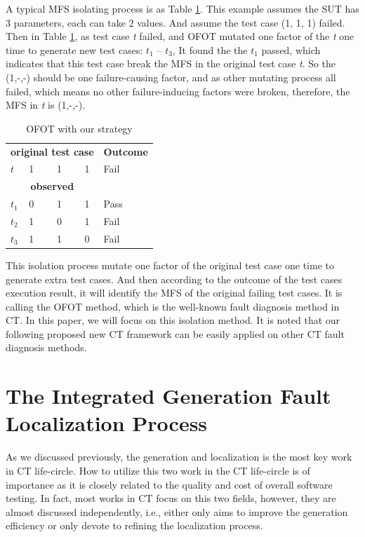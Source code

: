 \documentclass{sig-alternate}
\begin{document}
A typical MFS isolating process is as Table \ref{ofot-identify}. This example assumes the SUT has 3 parameters, each can take 2 values. And assume the test case (1, 1, 1) failed. Then in Table \ref{ofot-identify}, as test case \emph{t} failed, and OFOT mutated one factor of the \emph{t} one time to generate new test cases: $t_{1}$ -- $t_{3}$, It found the the $t_{1}$ passed, which indicates that this test case break the MFS in the original test case \emph{t}. So the (1,-,-) should be one failure-causing factor, and as other mutating process all failed, which means no other failure-inducing factors were broken, therefore, the MFS in \emph{t} is (1,-,-).

\begin{table}[h]
\caption{OFOT with our strategy}
\label{ofot-identify}
\center
\begin{tabular}{llllll}
\multicolumn{5}{c}{\bfseries original test case} & \bfseries Outcome \\
 $t$ & \multicolumn{4}{l}{1 \ \ \ \ 1 \ \ \ \  1 } & Fail \\
 \hline
\multicolumn{5}{c}{\bfseries observed} &  \\
$t_{1}$ &\multicolumn{4}{l}{0  \ \ \ \  1 \ \ \ \  1 }& Pass \\
$t_{2}$ &\multicolumn{4}{l}{1  \ \ \ \  0 \ \ \ \  1 } & Fail \\
$t_{3}$ &\multicolumn{4}{l}{1  \ \ \ \  1 \ \ \ \  0 } & Fail \\
\end{tabular}
\end{table}

This isolation process mutate one factor of the original test case one time to generate extra test cases. And then according to the outcome of the test cases execution result, it will identify the MFS of the original failing test cases. It is calling the OFOT method, which is the well-known fault diagnosis method in CT. In this paper, we will focus on this isolation method. It is noted that our following proposed new CT framework can be easily applied on other CT fault diagnosis methods.




\section{The Integrated Generation Fault Localization Process}
As we discussed previously, the generation and localization is the most key work in CT life-circle. How to utilize this two work in the CT life-circle is of importance as it is closely related to the quality and cost of overall software testing. In fact, most works in CT focus on this two fields, however, they are almost discussed independently, i.e., either only aims to improve the generation efficiency or only devote to refining the localization process.
\end{document}
